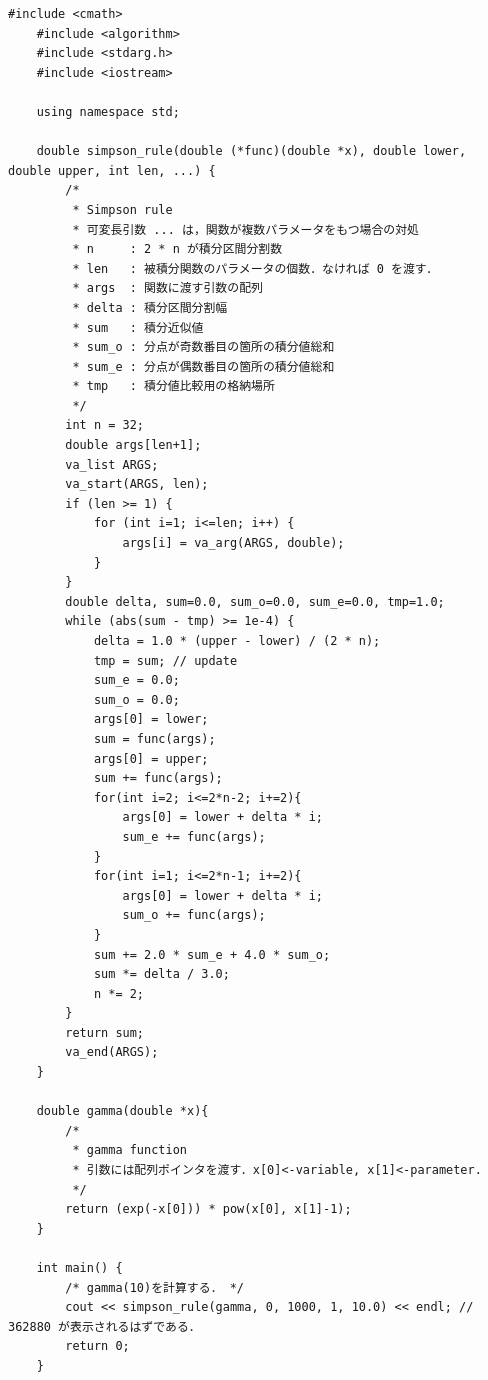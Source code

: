 \documentclass[a4j,papersize,disablejfam,slide,14pt]{jsarticle}
\begin{document}
    \begin{lstlisting}[style=customCpp]
    #include <cmath>
    #include <algorithm>
	#include <stdarg.h>
    #include <iostream>
    
    using namespace std;
    
    double simpson_rule(double (*func)(double *x), double lower, double upper, int len, ...) {
		/*
		 * Simpson rule
		 * 可変長引数 ... は，関数が複数パラメータをもつ場合の対処
		 * n     : 2 * n が積分区間分割数
		 * len   : 被積分関数のパラメータの個数．なければ 0 を渡す．
		 * args  : 関数に渡す引数の配列
		 * delta : 積分区間分割幅
		 * sum   : 積分近似値
		 * sum_o : 分点が奇数番目の箇所の積分値総和
		 * sum_e : 分点が偶数番目の箇所の積分値総和
		 * tmp   : 積分値比較用の格納場所
		 */
		int n = 32;
		double args[len+1];
		va_list ARGS;
		va_start(ARGS, len);
		if (len >= 1) {
			for (int i=1; i<=len; i++) {
				args[i] = va_arg(ARGS, double);
			}
		}
		double delta, sum=0.0, sum_o=0.0, sum_e=0.0, tmp=1.0;
		while (abs(sum - tmp) >= 1e-4) {
			delta = 1.0 * (upper - lower) / (2 * n);
			tmp = sum; // update
			sum_e = 0.0;
			sum_o = 0.0;
			args[0] = lower;
			sum = func(args);
			args[0] = upper;
			sum += func(args);
			for(int i=2; i<=2*n-2; i+=2){
				args[0] = lower + delta * i;
				sum_e += func(args);
			}
			for(int i=1; i<=2*n-1; i+=2){
				args[0] = lower + delta * i;
				sum_o += func(args);
			}
			sum += 2.0 * sum_e + 4.0 * sum_o;
			sum *= delta / 3.0;
			n *= 2;
		}
		return sum;
	    va_end(ARGS);
	}
    
    double gamma(double *x){
		/* 
         * gamma function 
         * 引数には配列ポインタを渡す．x[0]<-variable, x[1]<-parameter.
         */
	    return (exp(-x[0])) * pow(x[0], x[1]-1);
	}
    
    int main() {
    	/* gamma(10)を計算する． */
    	cout << simpson_rule(gamma, 0, 1000, 1, 10.0) << endl; // 362880 が表示されるはずである．
        return 0;
    }
    \end{lstlisting}
\end{document}
